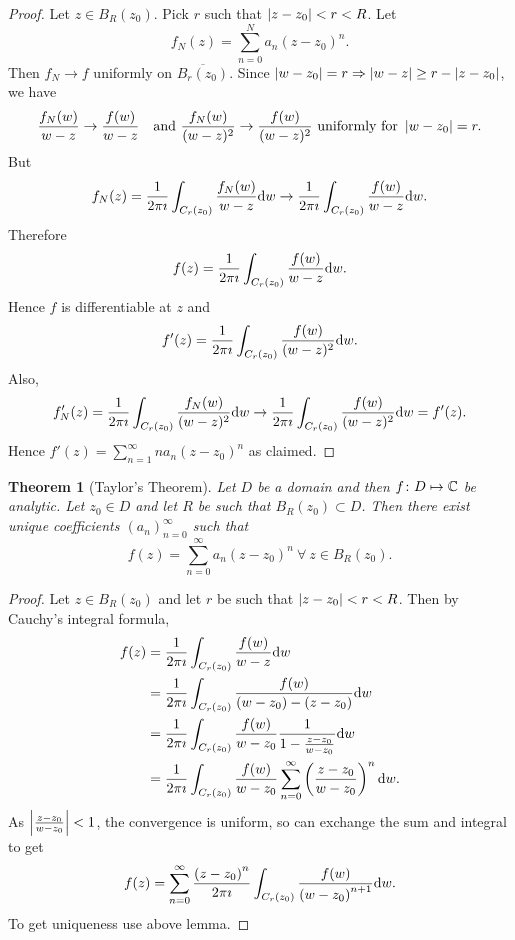 \documentclass{notes}
\theoremstyle{plain}
\newtheorem{theorem}[proposition]{Theorem}
\begin{document}
\begin{proof}
Let $z \in B_R(z_0)$.  Pick $r$ such that $\left|z-z_0\right| < r < R$.  Let
\[
f_N(z) = \sum_{n=0}^N a_n (z-z_0)^n.
\]
Then $f_N \rightarrow f$ uniformly
on $\overline{B_r(z_0)}$.  Since $\left|w - z_0\right| = r \Rightarrow
\left|w-z\right| \ge r - \left|z-z_0\right|$, we have \[
\frac{f_N(w)}{w-z} \rightarrow \frac{f(w)}{w-z} \quad \text{and }
\frac{f_N(w)}{(w-z)^2} \rightarrow \frac{f(w)}{(w-z)^2} \text{ uniformly for }
\left|w-z_0\right| = r.
\]
But \[
f_N(z) = \frac{1}{2 \pi \imath} \int_{C_r(z_0)} \frac{f_N(w)}{w-z} \mathrm{d} w
\rightarrow \frac{1}{2 \pi \imath} \int_{C_r(z_0)} \frac{f(w)}{w-z} \mathrm{d} w.
\]
Therefore \[
f(z) = \frac{1}{2 \pi \imath} \int_{C_r(z_0)} \frac{f(w)}{w-z} \mathrm{d} w.
\]
Hence $f$ is differentiable at $z$ and \[
f'(z) = \frac{1}{2 \pi \imath} \int_{C_r(z_0)} \frac{f(w)}{(w-z)^2} \mathrm{d} w.
\]
Also, \[
f_N'(z) = \frac{1}{2 \pi \imath} \int_{C_r(z_0)} \frac{f_N(w)}{(w-z)^2} \mathrm{d} w
\rightarrow \frac{1}{2 \pi \imath} \int_{C_r(z_0)} \frac{f(w)}{(w-z)^2} \mathrm{d} w
= f'(z).
\]
Hence $f'(z) = \sum_{n=1}^\infty n a_n (z-z_0)^n$ as claimed.
\end{proof}

\begin{theorem}[Taylor's Theorem]%
Let $D$ be a domain and then $f \colon D \mapsto \mathbb{C}$ be analytic.  Let $z_0 \in D$
and let $R$ be such that $B_R(z_0) \subset D$.  Then there exist unique
coefficients $(a_n)_{n=0}^\infty$ such that
\[
f(z) = \sum_{n=0}^\infty a_n (z-z_0)^n\ \forall\ z \in B_R(z_0).
\]
\end{theorem}

\begin{proof}
Let $z \in B_R(z_0)$ and let $r$ be such that $\left|z-z_0\right| < r < R$.  Then
by Cauchy's integral formula,
\begin{align*}
f(z) &= \frac{1}{2 \pi \imath} \int_{C_r(z_0)} \frac{f(w)}{w-z} \mathrm{d} w \\
&= \frac{1}{2 \pi \imath} \int_{C_r(z_0)} \frac{f(w)}{(w-z_0) - (z-z_0)} \mathrm{d} w \\
&= \frac{1}{2 \pi \imath} \int_{C_r(z_0)} \frac{f(w)}{w-z_0}
\frac{1}{1- \frac{z-z_0}{w-z_0}} \mathrm{d} w \\
&= \frac{1}{2 \pi \imath} \int_{C_r(z_0)} \frac{f(w)}{w-z_0}
\sum_{n=0}^\infty \left( \frac{z-z_0}{w-z_0} \right)^n \mathrm{d} w.
\end{align*}
As $\left|\frac{z-z_0}{w-z_0}\right| < 1$, the convergence is uniform, so can
exchange the sum and integral to get
\[
f(z) = \sum_{n=0}^\infty \frac{\left( z - z_0 \right)^n}{2 \pi \imath}
\int_{C_r(z_0)} \frac{f(w)}{\left( w - z_0 \right)^{n+1}} \mathrm{d} w.
\]
To get uniqueness use above lemma.
\end{proof}
\end{document}
